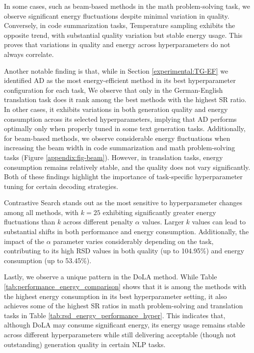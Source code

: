 In some cases, such as beam-based methods in the math problem-solving task, we observe significant energy fluctuations despite minimal variation in quality. Conversely, in code summarization tasks, Temperature sampling exhibits the opposite trend, with substantial quality variation but stable energy usage. This proves that variations in quality and energy across hyperparameters do not always correlate. 

Another notable finding is that, while in Section \ref{experimental:TG-EF} we identified AD as the most energy-efficient method in its best hyperparameter configuration for each task, We observe that only in the German-English translation task does it rank among the best methods with the highest SR ratio. In other cases, it exhibits variations in both generation quality and energy consumption across its selected hyperparameters, implying that AD performs optimally only when properly tuned in some text generation tasks. Additionally, for beam-based methods, we observe considerable energy fluctuations when increasing the beam width in code summarization and math problem-solving tasks (Figure \ref{appendix:fig-beam}). However, in translation tasks, energy consumption remains relatively stable, and the quality does not vary significantly. Both of these findings highlight the importance of task-specific hyperparameter tuning for certain decoding strategies. 

Contrastive Search stands out as the most sensitive to hyperparameter changes among all methods, with \(k=25\) exhibiting significantly greater energy fluctuations than \( k\) across different penalty \(\alpha\) values. Larger \( k\) values can lead to substantial shifts in both performance and energy consumption. Additionally, the impact of the \(\alpha\) parameter varies considerably depending on the task, contributing to its high RSD values in both quality (up to 104.95\%) and energy consumption (up to 53.45\%). 

Lastly, we observe a unique pattern in the DoLA method. While Table \ref{tab:performance_energy_comparison} shows that it is among the methods with the highest energy consumption in its best hyperparameter setting, it also achieves some of the highest SR ratios in math problem-solving and translation tasks in Table \ref{tab:rsd_energy_performance_hyper}. This indicates that, although DoLA may consume significant energy, its energy usage remains stable across different hyperparameters while still delivering acceptable (though not outstanding) generation quality in certain NLP tasks.



